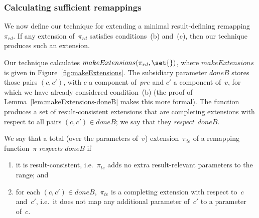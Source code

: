 \subsubsection{Calculating sufficient remappings}
\label{sec:necessary-algorithm}

We now define our technique for extending a minimal result-defining
remapping~$\pi_{rd}$.  If any extension of~$\pi_{rd}$ satisfies conditions~(b)
and~(c), then our technique produces such an extension.  

Our technique calculates $makeExtensions(\pi_{rd}, \set{})$, where
$makeExtensions$ is given in Figure~\ref{fig:makeExtensions}.  The subsidiary
parameter $doneB$ stores those pairs $(c,c')$, with $c$ a component of~$pre$
and $c'$ a component of~$v$, for which we have already considered
condition~(b) (the proof of Lemma~\ref{lem:makeExtensions-doneB} makes this
more formal).  The function produces a set of result-consistent extensions
that are completing extensions with respect to all pairs $(c,c') \in doneB$;
we say that they \emph{respect~$doneB$}.

\begin{definition}
We say that a total (over the parameters of~$v$) extension~$\pi_{te}$ of a
remapping function~$\pi$ \emph{respects $doneB$} if
%
\begin{enumerate}
\item it is result-consistent, i.e.~$\pi_{te}$ adds no extra result-relevant
parameters to the range; and
\item for each $(c,c') \in doneB$,\, $\pi_{te}$ is a completing extension with
respect to~$c$ and~$c'$, i.e.~it does not map any additional parameter of~$c'$
to a parameter of~$c$.
\end{enumerate}
\end{definition}


